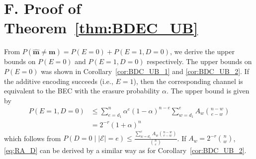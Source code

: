 \documentclass[10pt,twocolumn,twoside,submit]{JCNtran}
\begin{document}
\section*{F. Proof of Theorem~\ref{thm:BDEC_UB}\label{pf:BDEC_UB}}	

	From $P\left( \widehat{\mathbf{m}}  \ne {\mathbf{m}} \right) = P\left(E=0\right) + P\left(E=1, D=0\right)$, we derive the upper bounds on $P\left(E=0\right)$ and $P\left(E=1, D=0\right)$ respectively. The upper bounds on $P\left(E=0\right)$ was shown in Corollary~\ref{cor:BDC_UB_1} and \ref{cor:BDC_UB_2}. If the additive encoding succeeds (i.e., $E=1$), then the corresponding channel is equivalent to the BEC with the erasure probability $\alpha$. The upper bound is given by
	\begin{align}
		P\left(E=1, D=0\right) & \le \sum_{e = d_1}^{n}{\alpha^e \left(1 - \alpha \right)^{n-e}
			\sum_{w=d_1}^{e}{A_{w} \binom{n-w}{e-w}}} \nonumber \\
		& = 2^{-r} \left(1 + \alpha \right)^n \label{eq:RA_D}
	\end{align}
which follows from $
		P\left(D=0 \mid |{\mathcal{E}}|=e \right) \le \frac{\sum_{w=d_{1}}^{e}{A_{w} \binom{n-w}{e-w}}}{\binom{n}{e}}$. If $A_w = 2^{-r} \binom{n}{w}$, \eqref{eq:RA_D} can be derived by a similar way as for Corollary~\ref{cor:BDC_UB_2}. 
\end{document}
